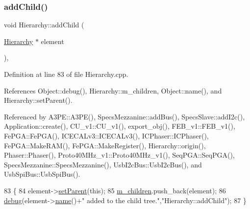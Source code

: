 \subsubsection{\texorpdfstring{add\+Child()}{addChild()}}
{\footnotesize\ttfamily void Hierarchy\+::add\+Child (\begin{DoxyParamCaption}\item[{\hyperlink{classHierarchy}{Hierarchy} $\ast$}]{element }\end{DoxyParamCaption})\hspace{0.3cm}{\ttfamily [virtual]}, {\ttfamily [inherited]}}



Definition at line 83 of file Hierarchy.\+cpp.



References Object\+::debug(), Hierarchy\+::m\+\_\+children, Object\+::name(), and Hierarchy\+::set\+Parent().



Referenced by A3\+P\+E\+::\+A3\+P\+E(), Specs\+Mezzanine\+::add\+Bus(), Specs\+Slave\+::add\+I2c(), Application\+::create(), C\+U\+\_\+v1\+::\+C\+U\+\_\+v1(), export\+\_\+obj(), F\+E\+B\+\_\+v1\+::\+F\+E\+B\+\_\+v1(), Fe\+P\+G\+A\+::\+Fe\+P\+G\+A(), I\+C\+E\+C\+A\+Lv3\+::\+I\+C\+E\+C\+A\+Lv3(), I\+C\+Phaser\+::\+I\+C\+Phaser(), Fe\+P\+G\+A\+::\+Make\+R\+A\+M(), Fe\+P\+G\+A\+::\+Make\+Register(), Hierarchy\+::origin(), Phaser\+::\+Phaser(), Proto40\+M\+Hz\+\_\+v1\+::\+Proto40\+M\+Hz\+\_\+v1(), Seq\+P\+G\+A\+::\+Seq\+P\+G\+A(), Specs\+Mezzanine\+::\+Specs\+Mezzanine(), Usb\+I2c\+Bus\+::\+Usb\+I2c\+Bus(), and Usb\+Spi\+Bus\+::\+Usb\+Spi\+Bus().


\begin{DoxyCode}
83                                           \{
84   element->\hyperlink{classHierarchy_a585ad1aeec16077a0e532ab8b4fc557b}{setParent}(\textcolor{keyword}{this});
85   \hyperlink{classHierarchy_a038816763941fd4a930504917f60483b}{m\_children}.push\_back(element);
86   \hyperlink{classObject_aac010553f022165573714b7014a15f0d}{debug}(element->\hyperlink{classObject_a300f4c05dd468c7bb8b3c968868443c1}{name}()+\textcolor{stringliteral}{" added to the child tree."},\textcolor{stringliteral}{"Hierarchy::addChild"});
87 \}
\end{DoxyCode}
\mbox{\label{classAttrib_aee7bbf16b144887f196e1341b24f8a26}} 
